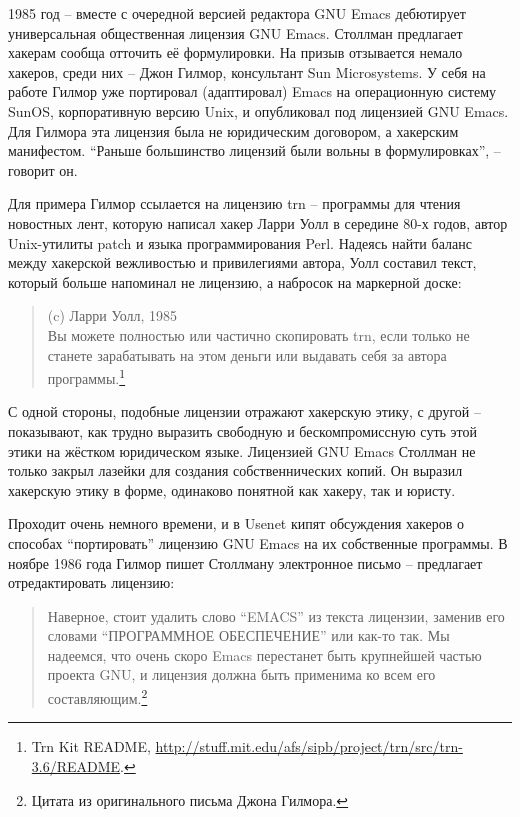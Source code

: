 1985 год -- вместе с очередной версией редактора GNU Emacs дебютирует универсальная общественная лицензия GNU Emacs. Столлман предлагает хакерам сообща отточить её формулировки. На призыв отзывается немало хакеров, среди них -- Джон Гилмор, консультант Sun Microsystems. У себя на работе Гилмор уже портировал (адаптировал) Emacs на операционную систему SunOS, корпоративную версию Unix, и опубликовал под лицензией GNU Emacs. Для Гилмора эта лицензия была не юридическим договором, а хакерским манифестом. \enquote{Раньше большинство лицензий были вольны в формулировках}, -- говорит он.

Для примера Гилмор ссылается на лицензию trn -- программы для чтения новостных лент, которую написал хакер Ларри Уолл в середине 80-х годов, автор Unix-утилиты patch и языка программирования Perl. Надеясь найти баланс между хакерской вежливостью и привилегиями автора, Уолл составил текст, который больше напоминал не лицензию, а набросок на маркерной доске:

\begin{quote}
(c) Ларри Уолл, 1985\\
Вы можете полностью или частично скопировать trn, если только не станете зарабатывать на этом деньги или выдавать себя за автора программы.\footnote{Trn Kit README, \url{http://stuff.mit.edu/afs/sipb/project/trn/src/trn-3.6/README}.}
\end{quote}

С одной стороны, подобные лицензии отражают хакерскую этику, с другой -- показывают, как трудно выразить свободную и бескомпромиссную суть этой этики на жёстком юридическом языке. Лицензией GNU Emacs Столлман не только закрыл лазейки для создания собственнических копий. Он выразил хакерскую этику в форме, одинаково понятной как хакеру, так и юристу.

Проходит очень немного времени, и в Usenet кипят обсуждения хакеров о способах \enquote{портировать} лицензию GNU Emacs на их собственные программы. В ноябре 1986 года Гилмор пишет Столлману электронное письмо -- предлагает отредактировать лицензию:

\begin{quote}
Наверное, стоит удалить слово \enquote{EMACS} из текста лицензии, заменив его словами \enquote{ПРОГРАММНОЕ ОБЕСПЕЧЕНИЕ} или как-то так. Мы надеемся, что очень скоро Emacs перестанет быть крупнейшей частью проекта GNU, и лицензия должна быть применима ко всем его составляющим.\footnote{Цитата из оригинального письма Джона Гилмора.}
\end{quote}

